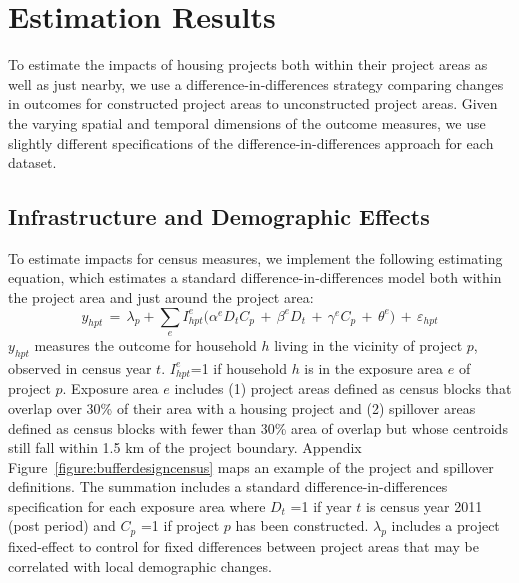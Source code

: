 \documentclass[12pt]{article}
\begin{document}



\section{Estimation Results}\label{section:results}

To estimate the impacts of housing projects both within their project areas as well as just nearby, we use a difference-in-differences strategy comparing changes in outcomes for constructed project areas to unconstructed project areas.  Given the varying spatial and temporal dimensions of the outcome measures, we use slightly different specifications of the difference-in-differences approach for each dataset.

\subsection{Infrastructure and Demographic Effects}\label{section:resultscensus}

To estimate impacts for census measures, we implement the following estimating equation, which estimates a standard difference-in-differences model both within the project area and just around the project area:
\begin{equation*}
y_{hpt} \, = \, \lambda_p + \sum\limits_{e} I^e_{hpt}\Big( \alpha^e D_tC_p \, + \, \beta^eD_t \, + \, \gamma^eC_p \, + \, \theta^e \Big) \, + \, \varepsilon_{hpt}
\end{equation*}
$y_{hpt}$ measures the outcome for household $h$ living in the vicinity of project $p$, observed in census year $t$.  $I^e_{hpt}$=1 if household $h$ is in the exposure area $e$ of project $p$.  Exposure area $e$ includes (1) project areas defined as census blocks that overlap over 30\% of their area with a housing project and (2) spillover areas defined as census blocks with fewer than 30\% area of overlap but whose centroids still fall within 1.5 km of the project boundary.  Appendix Figure~\ref{figure:bufferdesigncensus} maps an example of the project and spillover definitions.  The summation includes a standard difference-in-differences specification for each exposure area where $D_{t}\,\,$=1 if year $t$ is census year 2011 (post period) and $C_{p}\,\,$=1 if project $p$ has been constructed.  $\lambda_p$ includes a project fixed-effect to control for fixed differences between project areas that may be correlated with local demographic changes.  
\end{document}
